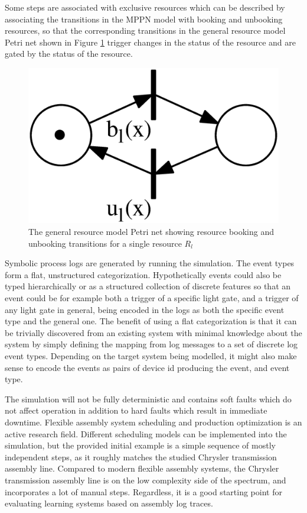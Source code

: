 \documentclass[journal]{IEEEtran}
\begin{document}
Some steps are associated with exclusive resources which can be described by associating the transitions in the MPPN model with booking and unbooking resources, so that
the corresponding transitions in the general resource model Petri net shown in Figure \ref{figure:resource_model} trigger changes in the status of the resource and
are gated by the status of the resource.

\begin{figure}[tb]
 \centering
 \includegraphics[width=8 cm,keepaspectratio=true]{./general_resource_model.eps}
 \caption{The general resource model Petri net showing resource booking and unbooking transitions for a single resource $ R_l $}
 \label{figure:resource_model}
\end{figure}

Symbolic process logs are generated by running the simulation. The event types form a flat, unstructured categorization. Hypothetically events could also be typed hierarchically or as a structured collection
of discrete features so that an event could be for example both
a trigger of a specific light gate, and a trigger of any light gate in general, being encoded in the logs as both the specific event type and the general one. The benefit of using a flat categorization is that
it can be trivially discovered from an existing system with minimal knowledge about the system by simply defining the mapping from log messages to a set of discrete log event types.
Depending on the target system being modelled, it might also make sense to encode the events as pairs of device id producing the event, and event type.

The simulation will not be fully deterministic and contains soft faults which do not affect operation in addition to hard faults which result in immediate downtime.
Flexible assembly system scheduling and production optimization is an active research field. Different scheduling models can be implemented into the simulation,
but the provided initial example is a simple sequence of mostly independent steps, as it roughly matches the studied Chrysler transmission assembly line.
Compared to modern flexible assembly systems, the Chrysler transmission assembly line is on the low complexity side of the spectrum, and incorporates a lot of manual steps.
Regardless, it is a good starting point for evaluating learning systems based on assembly log traces.
\end{document}
